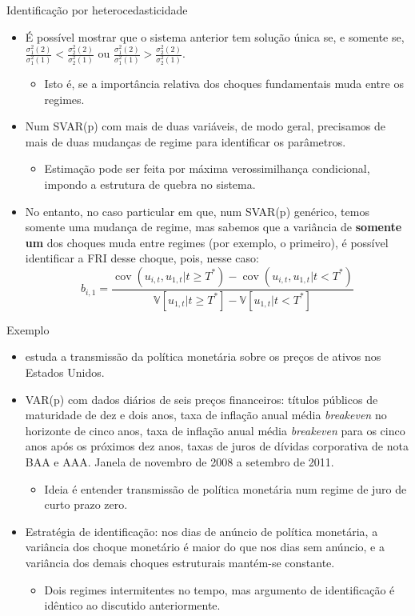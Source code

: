\documentclass[11pt]{beamer}
\begin{document}
\begin{frame}{Identificação por heterocedasticidade}
	\begin{itemize}
		\item É possível mostrar que o sistema anterior tem solução única se, e somente se, $\frac{\sigma^2_1(2)}{\sigma^2_1(1)} < \frac{\sigma^2_2(2)}{\sigma^2_2(1)}$ ou $\frac{\sigma^2_1(2)}{\sigma^2_1(1)} > \frac{\sigma^2_2(2)}{\sigma^2_2(1)}$.
		\begin{itemize}
			\item Isto é, se a importância relativa dos choques fundamentais muda entre os regimes.
		\end{itemize}
		\item Num SVAR(p) com mais de duas variáveis, de modo geral, precisamos de mais de duas mudanças de regime para identificar os parâmetros.
		\begin{itemize}
			\item Estimação pode ser feita por máxima verossimilhança condicional, impondo a estrutura de quebra no sistema.
		\end{itemize}
		\item No entanto, no caso particular em que, num SVAR(p) genérico, temos somente uma mudança de regime, {\color{blue}mas sabemos que a variância de \textbf{somente um} dos choques muda entre regimes} (por exemplo, o primeiro), é possível identificar a FRI desse choque, pois, nesse caso:
		$$b_{i,1} = \frac{\operatorname{cov}(u_{i,t}, u_{1,t}|t\geq T^*)- \operatorname{cov}(u_{i,t}, u_{1,t}|t< T^*)}{\mathbb{V}[u_{1,t}|t\geq T^*]-\mathbb{V}[u_{1,t}|t< T^*]}$$
	\end{itemize}
\end{frame}

\begin{frame}{Exemplo}
\begin{itemize}
	\item 	\citet{Wright2012} estuda a transmissão da política monetária sobre os preços de ativos nos Estados Unidos.
	\item VAR(p) com dados diários de seis preços financeiros: títulos públicos de maturidade de dez e dois anos, taxa de inflação anual média \textit{breakeven} no horizonte de cinco anos, taxa de inflação anual média \textit{breakeven} para os cinco anos após os próximos dez anos, taxas de juros de dívidas corporativa de nota BAA e AAA. Janela de novembro de 2008 a setembro de 2011.
	\begin{itemize}
		\item Ideia é entender transmissão de política monetária num regime de juro de curto prazo zero.
	\end{itemize}
	\item Estratégia de identificação: nos dias de anúncio de política monetária, a variância dos choque monetário é maior do que nos dias sem anúncio, e a variância dos demais choques estruturais mantém-se constante.
	\begin{itemize}
		\item Dois regimes intermitentes no tempo, mas argumento de identificação é idêntico ao discutido anteriormente.
	\end{itemize} 
\end{itemize}
\end{frame}
\end{document}
